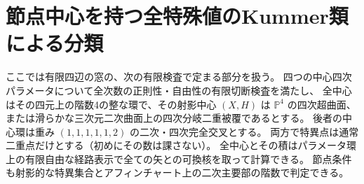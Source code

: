 \section{節点中心を持つ全特殊値のKummer類による分類}
\label{sec:nodal-center-special-values}
ここでは有限四辺の窓の、次の有限検査で定まる部分を扱う。
四つの中心四次パラメータについて全次数の正則性・自由性の有限切断検査を満たし、
全中心はその四元上の階数4の整な環で、その射影中心 $(X,H)$ は
$\mathbb P^4$ の四次超曲面、または滑らかな三次元二次曲面上の四次分岐二重被覆であるとする。
後者の中心環は重み $(1,1,1,1,1,2)$ の二次・四次完全交叉とする。
両方で特異点は通常二重点だけとする（初めにその数は課さない）。
全中心とその積はパラメータ環上の有限自由な経路表示で全ての矢との可換核を取って計算できる。
節点条件も射影的な特異集合とアフィンチャート上の二次主要部の階数で判定できる。

